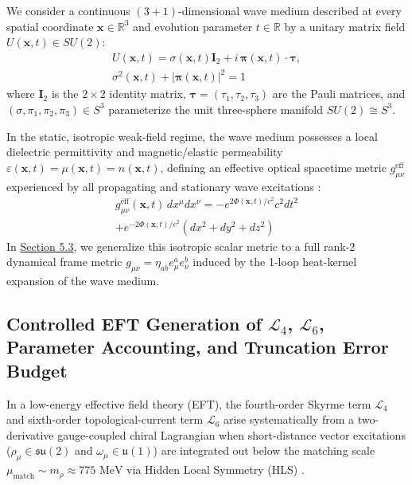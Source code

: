 \documentclass[10pt,aps,prd,twocolumn,superscriptaddress,nofootinbib,floatfix,longbibliography,showkeys]{revtex4-2}
\begin{document}
We consider a continuous $(3+1)$-dimensional wave medium described at every spatial coordinate $\mathbf{x} \in \mathbb{R}^3$ and evolution parameter $t \in \mathbb{R}$ by a unitary matrix field $U(\mathbf{x}, t) \in SU(2)$:
\begin{equation}
\begin{gathered}
U(\mathbf{x}, t) = \sigma(\mathbf{x}, t)\mathbf{I}_2 + i\,\boldsymbol{\pi}(\mathbf{x}, t)\cdot\boldsymbol{\tau}, \\
\sigma^2(\mathbf{x}, t) + |\boldsymbol{\pi}(\mathbf{x}, t)|^2 = 1
\end{gathered}
\end{equation}
where $\mathbf{I}_2$ is the $2\times 2$ identity matrix, $\boldsymbol{\tau} = (\tau_1, \tau_2, \tau_3)$ are the Pauli matrices, and $(\sigma,\allowbreak \pi_1,\allowbreak \pi_2,\allowbreak \pi_3) \in S^3$ parameterize the unit three-sphere manifold $SU(2) \cong S^3$.

In the static, isotropic weak-field regime, the wave medium possesses a local dielectric permittivity and magnetic/elastic permeability $\varepsilon(\mathbf{x}, t) = \mu(\mathbf{x}, t) = n(\mathbf{x}, t)$, defining an effective optical spacetime metric $g_{\mu\nu}^{\text{eff}}$ experienced by all propagating and stationary wave excitations \cite{ref12,ref14,ref17}:
\begin{multline}
g_{\mu\nu}^{\text{eff}}(\mathbf{x}, t)\,dx^\mu dx^\nu = -e^{2\Phi(\mathbf{x}, t)/c^2} c^2 dt^2 \\
+ e^{-2\Phi(\mathbf{x}, t)/c^2}\left(dx^2 + dy^2 + dz^2\right)
\end{multline}
In \hyperref[sec:5.3]{Section 5.3}, we generalize this isotropic scalar metric to a full rank-2 dynamical frame metric $g_{\mu\nu} = \eta_{ab} e^a_\mu e^b_\nu$ induced by the 1-loop heat-kernel expansion of the wave medium.


\subsection{Controlled EFT Generation of $\mathcal{L}_4$, $\mathcal{L}_6$, Parameter Accounting, and Truncation Error Budget}\label{sec:2.2}

In a low-energy effective field theory (EFT), the fourth-order Skyrme term $\mathcal{L}_4$ and sixth-order topological-current term $\mathcal{L}_6$ arise systematically from a two-derivative gauge-coupled chiral Lagrangian when short-distance vector excitations ($\rho_\mu \in \mathfrak{su}(2)$ and $\omega_\mu \in \mathfrak{u}(1)$) are integrated out below the matching scale $\mu_{\text{match}} \sim m_\rho \approx 775\text{ MeV}$ via Hidden Local Symmetry (HLS) \cite{ref6,ref7,ref8,ref9,ref10,ref48,ref49}.
\end{document}
